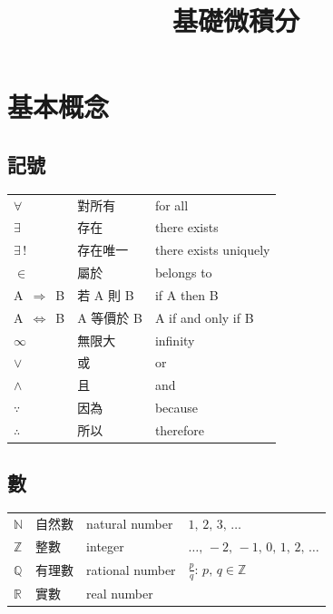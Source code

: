 \documentclass[12pt]{extarticle}
\newcommand{\ds}{\displaystyle}
\theoremstyle{definition}
\begin{document}
\title{\texorpdfstring{\vspace{-16mm} 基礎微積分}{基礎微積分}} 
\author{\vspace{-5em}}
\date{\vspace{-5em}}
\maketitle
\thispagestyle{firststyle}

\section*{基本概念}
\subsection*{記號}

\begin{table}[!htbp]
  \centering
  \begin{tabular}{lll}
    \toprule
    $\forall$ & 對所有 & for all \\
    $\exists$ & 存在   & there exists \\
    $\exists\,!$ & 存在唯一 & there exists uniquely \\
    $\in$ & 屬於 & belongs to \\
    A $\,\Longrightarrow\,$ B &  若 A 則 B & if A then B \\
    A $\,\Longleftrightarrow\,$ B &  A 等價於 B & A if and only if B \\
    $\infty$ & 無限大 & infinity \\
    $\vee$ & 或 & or \\
    $\wedge$ & 且 & and \\
    $\because$ & 因為 & because \\
    $\therefore$ & 所以 & therefore \\
    \bottomrule
  \end{tabular}
\end{table}

\subsection*{數}

\begin{table}[!htbp]
  \centering
  \begin{tabular}{llll}
    \toprule
    $\mathbb{N}$ & 自然數 & natural number & $1,\,2,\,3,\,\ldots$ \\
    $\mathbb{Z}$ & 整數   & integer & $\ldots,\,-2,\,-1,\,0,\,1,\,2,\,\ldots$\\
    $\mathbb{Q}$ & 有理數 & rational number & $\ds\frac{p}{q}: \,p,\,q\in\mathbb{Z}$ \\
    $\mathbb{R}$ & 實數 & real number &  \\
    \bottomrule
  \end{tabular}
\end{table}
\end{document}
